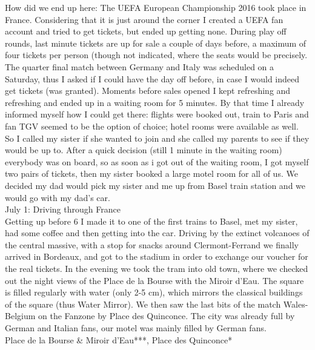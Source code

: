 How did we end up here: The UEFA European Championship 2016 took place in France. Considering that it is just around the corner I created a UEFA fan account and tried to get tickets, but ended up getting none. During play off rounds, last minute tickets are up for sale a couple of days before, a maximum of four tickets per person (though not indicated, where the seats would be precisely. The quarter final match between Germany and Italy was scheduled on a Saturday, thus I asked if I could have the day off before, in case I would indeed get tickets (was granted). Moments before sales opened I kept refreshing and refreshing and ended up in a waiting room for 5 minutes. By that time I already informed myself how I could get there: flights were booked out, train to Paris and fan TGV seemed to be the option of choice; hotel rooms were available as well. So I called my sister if she wanted to join and she called my parents to see if they would be up to. After a quick decision (still 1 minute in the waiting room) everybody was on board, so as soon as i got out of the waiting room, I got myself two pairs of tickets, then my sister booked a large motel room for all of us. We decided my dad would pick my sister and me up from Basel train station and we would go with my dad's car.\\

July 1: Driving through France\\
Getting up before 6 I made it to one of the first trains to Basel, met my sister, had some coffee and then getting into the car. Driving by the extinct volcanoes of the central massive, with a stop for snacks around Clermont-Ferrand we finally arrived in Bordeaux, and got to the stadium in order to exchange our voucher for the real tickets. In the evening we took the tram into old town, where we checked out the night views of the Place de la Bourse with the Miroir d'Eau. The square is filled regularly with water (only 2-5 cm), which mirrors the classical buildings of the square (thus Water Mirror). We then saw the last bits of the match Wales-Belgium on the Fanzone by Place des Quinconce. The city was already full by German and Italian fans, our motel was mainly filled by German fans.\\

Place de la Bourse \& Miroir d'Eau***, Place des Quinconce*\\

